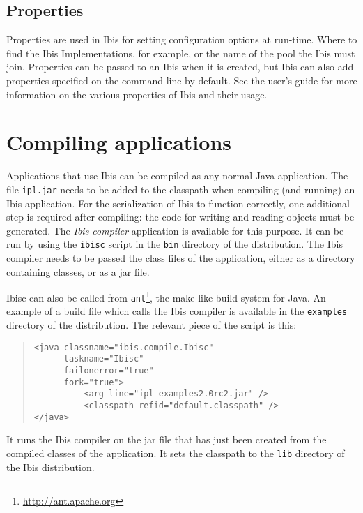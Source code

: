 \documentclass[10pt]{article}
\begin{document}
\subsection{Properties}
\label{properties}

Properties are used in Ibis for setting configuration options at
run-time. Where to find the Ibis Implementations, for example, or the name
of the pool the Ibis must join. Properties can be passed to an Ibis when it is
created, but Ibis can also add properties specified on the command line
by default. See the user's guide for more information on the various
properties of Ibis and their usage.

\section{Compiling applications}
\label{compiling}


Applications that use Ibis can be compiled as any normal Java
application. The file \texttt{ipl.jar} needs to be added to the
classpath when compiling (and running) an Ibis application. For the
serialization of Ibis to function correctly, one additional step is
required after compiling: the code for writing and reading objects must
be generated. The \emph{Ibis compiler} application is available for
this purpose. It can be run by using the \texttt{ibisc}
script in the \texttt{bin} directory of the distribution. The Ibis
compiler needs to be passed the class files of the application, either
as a directory containing classes, or as a jar file.

Ibisc can also be called from
\texttt{ant}\footnote{\url{http://ant.apache.org}}, the make-like build
system for Java. An example of a build file which calls the Ibis
compiler is available in the \texttt{examples} directory of the
distribution. The relevant piece of the script is this:

\begin{quote}
\begin{verbatim}
<java classname="ibis.compile.Ibisc"
      taskname="Ibisc"
      failonerror="true"
      fork="true">
          <arg line="ipl-examples2.0rc2.jar" />
          <classpath refid="default.classpath" />
</java>
\end{verbatim}
\end{quote}

It runs the Ibis compiler on the jar file that has just been created
from the compiled classes of the application. It sets the classpath to
the \texttt{lib} directory of the Ibis distribution.
\end{document}
